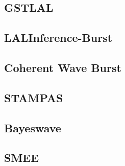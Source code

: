 
\subsection{GSTLAL}
\label{sec:gstlal}

\subsection{LALInference-Burst}
\label{sec:libpipeline}

\subsection{Coherent Wave Burst}
\label{sec:cwb-pipeline}

\subsection{STAMPAS}
\label{sec:stampas}

\subsection{Bayeswave}
\label{sec:bayeswave}

\subsection{SMEE}
\label{smee}

